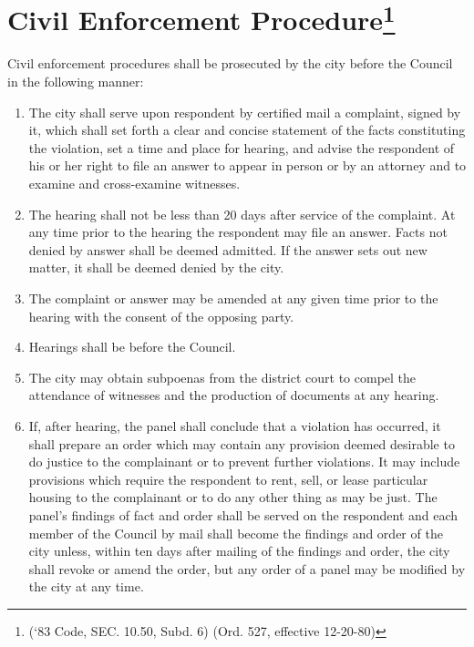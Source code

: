 \section{Civil Enforcement Procedure\footnote{(‘83 Code, SEC. 10.50, Subd. 6)  (Ord. 527, effective 12-20-80)}}
Civil enforcement procedures shall be prosecuted by the city before the Council in the following manner:
\begin{enumerate}[{\indent}A)]
    \item The city shall serve upon respondent by certified mail a complaint, signed by it, which shall set forth a clear and concise statement of the facts constituting the violation, set a time and place for hearing, and advise the respondent of his or her right to file an answer to appear in person or by an attorney and to examine and cross-examine witnesses.
    \item The hearing shall not be less than 20 days after service of the complaint.  At any time prior to the hearing the respondent may file an answer.  Facts not denied by answer shall be deemed admitted.  If the answer sets out new matter, it shall be deemed denied by the city.
    \item The complaint or answer may be amended at any given time prior to the hearing with the consent of the opposing party.
    \item Hearings shall be before the Council.
    \item The city may obtain subpoenas from the district court to compel the attendance of witnesses and the production of documents at any hearing.
    \item If, after hearing, the panel shall conclude that a violation has occurred, it shall prepare an order which may contain any provision deemed desirable to do justice to the complainant or to prevent further violations.  It may include provisions which require the respondent to rent, sell, or lease particular housing to the complainant or to do any other thing as may be just.  The panel’s findings of fact and order shall be served on the respondent and each member of the Council by mail shall become the findings and order of the city unless, within ten days after mailing of the findings and order, the city shall revoke or amend the order, but any order of a panel may be modified by the city at any time.
\end{enumerate}
